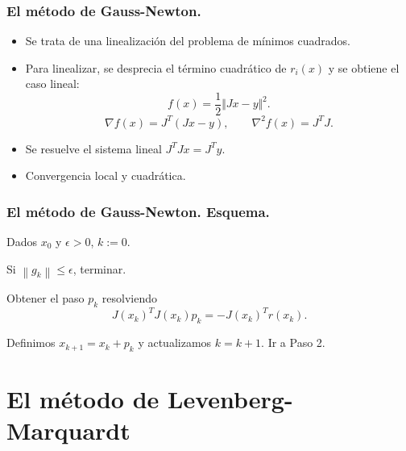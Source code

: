 \documentclass{beamer}
\newcommand{\norm}[1]{\left\lVert#1\right\rVert}
\begin{document}
\begin{frame}
    \frametitle{El método de Gauss-Newton.}\pause
    \begin{itemize}[label=\textbullet]
        \item Se trata de una linealización del problema de mínimos cuadrados. \pause
        \item Para linealizar, se desprecia el término cuadrático de $r_i(x)$ y se obtiene el caso lineal:
        \begin{equation*}
            f(x) = \frac{1}{2} \Vert Jx-y \Vert^2.
        \end{equation*}
        \begin{equation*}
            \nabla f(x) = J^T(Jx-y), \qquad \nabla^2 f(x) =  J^TJ.
        \end{equation*}
        \pause
        \item Se resuelve el sistema lineal $J^TJx = J^Ty$. \pause
        \item Convergencia local y cuadrática.
    \end{itemize}
\end{frame}

\begin{frame}
    \frametitle{El método de Gauss-Newton. Esquema.} \pause
    \begin{steps}
        \item Dados $x_0$ y $\epsilon > 0$, $k:=0$. \pause 
        \item Si $\norm{g_k} \leq \epsilon$, terminar. \pause
        \item Obtener el paso $p_k$ resolviendo
            \begin{equation*}
                J(x_k)^TJ(x_k)p_k = -J(x_k)^Tr(x_k).
            \end{equation*} \pause 
        \item Definimos $x_{k+1} = x_k + p_k$ y actualizamos $k=k+1$. Ir a Paso 2.
    \end{steps}

\end{frame}


\section{El método de Levenberg-Marquardt}
\end{document}
